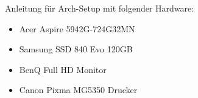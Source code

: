 Anleitung für Arch-Setup mit folgender Hardware:
\begin{itemize}
    \item Acer Aspire 5942G-724G32MN
    \item Samsung SSD 840 Evo 120GB 
    \item BenQ Full HD Monitor 
    \item Canon Pixma MG5350 Drucker
\end{itemize}
